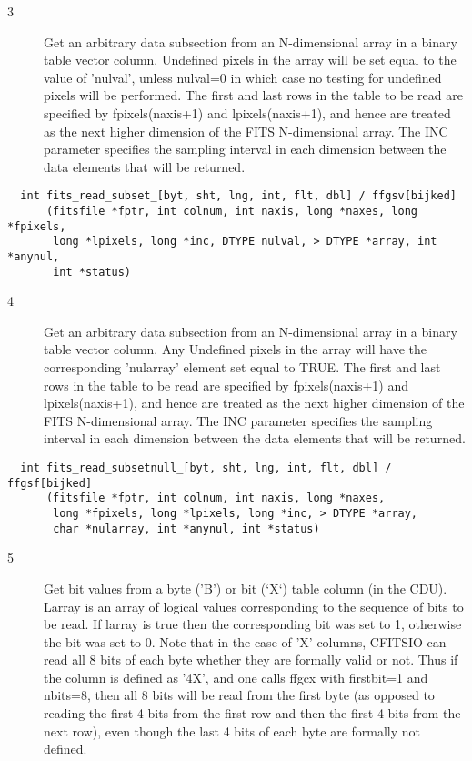 \begin{description}
\item[3 ] Get an arbitrary data subsection from an N-dimensional array
    in a binary table vector column.  Undefined pixels
    in the array will be set equal to the value of 'nulval',
    unless nulval=0 in which case no testing for undefined pixels will
    be performed.  The first and last rows in the table to be read
    are specified by fpixels(naxis+1) and lpixels(naxis+1), and hence
    are treated as the next higher dimension of the FITS N-dimensional
    array.  The INC parameter specifies the sampling interval in
   each dimension between the data elements that will be returned.
\end{description}

\begin{verbatim}
  int fits_read_subset_[byt, sht, lng, int, flt, dbl] / ffgsv[bijked]
      (fitsfile *fptr, int colnum, int naxis, long *naxes, long *fpixels,
       long *lpixels, long *inc, DTYPE nulval, > DTYPE *array, int *anynul,
       int *status)
\end{verbatim}

\begin{description}
\item[4 ] Get an arbitrary data subsection from an N-dimensional array
    in a binary table vector column.  Any Undefined
    pixels in the array will have the corresponding 'nularray'
    element set equal to TRUE.  The first and last rows in the table
    to be read are specified by fpixels(naxis+1) and lpixels(naxis+1),
    and hence are treated as the next higher dimension of the FITS
    N-dimensional array.  The INC parameter specifies the sampling
    interval in each dimension between the data elements that will be
   returned.
\end{description}

\begin{verbatim}
  int fits_read_subsetnull_[byt, sht, lng, int, flt, dbl] / ffgsf[bijked]
      (fitsfile *fptr, int colnum, int naxis, long *naxes,
       long *fpixels, long *lpixels, long *inc, > DTYPE *array,
       char *nularray, int *anynul, int *status)
\end{verbatim}

\begin{description}
\item[5 ] Get bit values from a byte ('B') or bit (`X`) table column (in the
    CDU).  Larray is an array of logical values corresponding to the
    sequence of bits to be read.  If larray is true then the
    corresponding bit was set to 1, otherwise the bit was set to 0.
    Note that in the case of 'X' columns, CFITSIO can read  all 8 bits
    of each byte whether they are formally valid or not.  Thus if the
    column is defined as '4X', and one calls ffgcx with  firstbit=1 and
    nbits=8, then all 8 bits will be read from the first byte (as
    opposed to reading the first 4 bits from the first row and then the
    first 4 bits from the next row), even though the last 4 bits of
   each byte are formally not defined.
\end{description}

